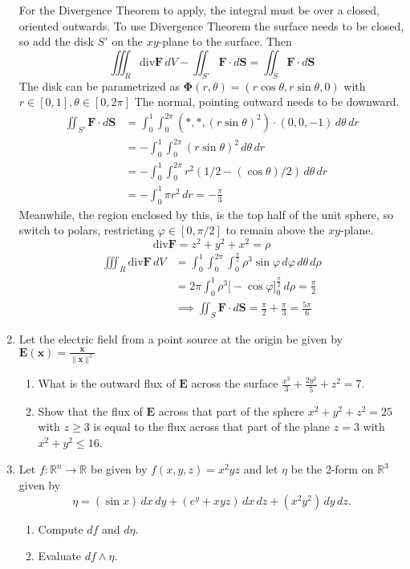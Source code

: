 \documentclass{article}
\newcommand{\norm}[1]{\| #1 \|}
\newcommand{\divt}{\text{div}}
\begin{document}
\begin{enumerate}
    For the Divergence Theorem to apply, the integral must be over a closed, oriented outwards. To use Divergence Theorem the surface needs to be closed, so add the disk $S'$ on the $xy$-plane to the surface. Then
    \[\iiint_R \divt \boldsymbol F \, dV - \iint_{S'} \boldsymbol F \cdot d \boldsymbol S = \iint_S \boldsymbol F \cdot d\boldsymbol S\]
    The disk can be parametrized as $\boldsymbol \Phi (r, \theta) = (r\cos \theta, r\sin \theta, 0)$ with $r \in [0,1], \theta \in [0,2\pi]$ The normal, pointing outward needs to be downward.
    \begin{align*} 
        \iint_{S'} \boldsymbol F \cdot d \boldsymbol S &= \int_0^1 \int_0^{2\pi} (*,*,(r\sin \theta)^2) \cdot (0,0,-1) \, d \theta \,d r \\
        &= - \int_0^1 \int_0^{2\pi} (r\sin \theta)^2 \, d \theta \,d r \\
        &= - \int_0^1 \int_0^{2\pi} r^2 (1/2 - (\cos \theta)/2) \, d \theta \,d r \\
        &= - \int_0^1 \pi r^2 \,d r = - \frac{\pi}{3}
    \end{align*}
    Meanwhile, the region enclosed by this, is the top half of the unit sphere, so switch to polars, restricting $\varphi \in [0,\pi/2]$ to remain above the $xy$-plane.
    \[\divt \boldsymbol F = z^2 + y^2 + x^2 = \rho\]
    \begin{align*} 
        \iiint_R \divt \boldsymbol F \, dV &= \int_0^1 \int_0^{2\pi} \int_0^{\frac{\pi}{2}} \rho^3 \sin\varphi \, d\varphi \, d\theta \, d \rho \\
        &= 2\pi \int_0^1 \rho^3 \big[ -\cos\varphi\big]_0^{\frac{\pi}{2}} \, d \rho = \frac{\pi}{2} \\
        & \implies \iint_S \boldsymbol F \cdot d \boldsymbol S = \frac{\pi}{2} + \frac{\pi}{3} = \frac{5\pi}{6}
    \end{align*}


\newpage
\item Let the electric field from a point source at the origin be given by $\displaystyle \boldsymbol E (\boldsymbol x) = \frac{\boldsymbol x}{\norm{\boldsymbol x}^3}$
    \begin{enumerate}
        \item What is the outward flux of $\boldsymbol E$ across the surface $\displaystyle \frac{x^2}{3} + \frac{2y^2}{5} + z^2 = 7$.
        \item Show that the flux of $\boldsymbol E$ across that part of the sphere $x^2 + y^2 + z^2 = 25$ with $z \geq 3$ is equal to the flux across that part of the plane $z = 3$ with $x^2 + y^2 \leq 16$.
    \end{enumerate} 
\newpage
\item Let $f : \mathbb{R}^n \rightarrow \mathbb{R}$ be given by $f(x,y,z) = x^2yz$ and let $\eta$ be the 2-form on $\mathbb{R}^3$ given by \[ \eta = (\sin x) \, dx \, dy + (e^y + xyz) \, dx \, dz + (x^2y^2) \, dy \, dz .\]
    \begin{enumerate}
        \item Compute $df$ and $d\eta$.
        \item Evaluate $df \wedge \eta$.
    \end{enumerate} 
\end{enumerate}
\end{document}
